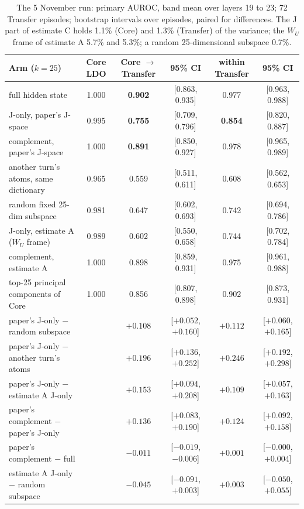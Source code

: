 \documentclass[11pt,a4paper]{article}
\newcommand{\WU}{W_U}
\begin{document}
\begin{table}[H]
\centering\footnotesize\setlength{\tabcolsep}{4pt}
\begin{tabularx}{\textwidth}{@{}Lccccc@{}}
\toprule
Arm ($k=25$) & Core LDO & Core $\to$ Transfer & 95\% CI & within Transfer & 95\% CI \\
\midrule
full hidden state & 1.000 & \textbf{0.902} & [0.863, 0.935] & 0.977 & [0.963, 0.988] \\
J-only, paper's J-space & 0.995 & \textbf{0.755} & [0.709, 0.796] & \textbf{0.854} & [0.820, 0.887] \\
complement, paper's J-space & 1.000 & \textbf{0.891} & [0.850, 0.927] & 0.978 & [0.965, 0.989] \\
another turn's atoms, same dictionary & 0.965 & 0.559 & [0.511, 0.611] & 0.608 & [0.562, 0.653] \\
random fixed 25-dim subspace & 0.981 & 0.647 & [0.602, 0.693] & 0.742 & [0.694, 0.786] \\
J-only, estimate A ($\WU$ frame) & 0.989 & 0.602 & [0.550, 0.658] & 0.744 & [0.702, 0.784] \\
complement, estimate A & 1.000 & 0.898 & [0.859, 0.931] & 0.975 & [0.961, 0.988] \\
top-25 principal components of Core & 1.000 & 0.856 & [0.807, 0.898] & 0.902 & [0.873, 0.931] \\
\midrule
paper's J-only $-$ random subspace & & $+0.108$ & [$+0.052$, $+0.160$] & $+0.112$ & [$+0.060$, $+0.165$] \\
paper's J-only $-$ another turn's atoms & & $+0.196$ & [$+0.136$, $+0.252$] & $+0.246$ & [$+0.192$, $+0.298$] \\
paper's J-only $-$ estimate A J-only & & $+0.153$ & [$+0.094$, $+0.208$] & $+0.109$ & [$+0.057$, $+0.163$] \\
paper's complement $-$ paper's J-only & & $+0.136$ & [$+0.083$, $+0.190$] & $+0.124$ & [$+0.092$, $+0.158$] \\
paper's complement $-$ full & & $-0.011$ & [$-0.019$, $-0.006$] & $+0.001$ & [$-0.000$, $+0.004$] \\
estimate A J-only $-$ random subspace & & $-0.045$ & [$-0.091$, $+0.003$] & $+0.003$ & [$-0.050$, $+0.055$] \\
\bottomrule
\end{tabularx}
\caption{The 5 November run: primary AUROC, band mean over layers 19 to 23; 72 Transfer episodes; bootstrap intervals over episodes, paired for differences. The J part of estimate C holds 1.1\% (Core) and 1.3\% (Transfer) of the variance; the $\WU$ frame of estimate A 5.7\% and 5.3\%; a random 25-dimensional subspace 0.7\%.}
\label{tab:paper}
\end{table}
\end{document}
